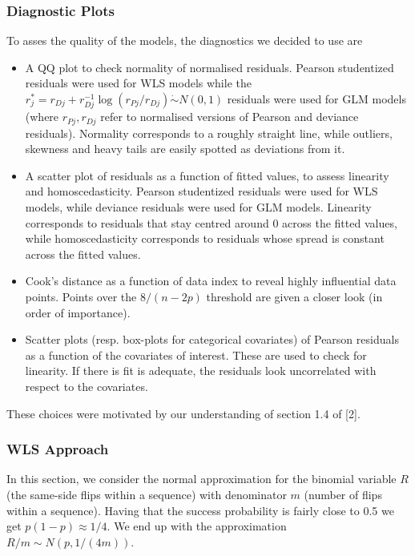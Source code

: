 \documentclass[a4paper, 12pt,oneside]{article}
\begin{document}
			\subsubsection{Diagnostic Plots}
				To asses the quality of the models, the diagnostics we decided to use are 
				\begin{itemize}
					\item A QQ plot to check normality of normalised residuals. Pearson studentized residuals were used for WLS models while the $r_j^*=r_{D j}+r_{D j}^{-1} \log \left(r_{P j} / r_{D j}\right) \dot{\sim} N(0,1)$ residuals were used for GLM models (where $r_{P j},r_{D j}$ refer to normalised versions of Pearson and deviance residuals). Normality corresponds to a roughly straight line, while outliers, skewness and heavy tails are easily spotted as deviations from it.
					\item A scatter plot of residuals as a function of fitted values, to assess linearity and homoscedasticity. Pearson studentized residuals were used for WLS models, while deviance residuals were used for GLM models. Linearity corresponds to residuals that stay centred around 0 across the fitted values, while homoscedasticity corresponds to residuals whose spread is constant across the fitted values.
					\item Cook's distance as a function of data index to reveal highly influential data points. Points over the $8/(n-2p)$ threshold are given a closer look (in order of importance). 
					\item Scatter plots (resp. box-plots for categorical covariates) of Pearson residuals as a function of the covariates of interest. These are used to check for linearity. If there is fit is adequate, the residuals look uncorrelated with respect to the covariates. 
				\end{itemize}
				These choices were motivated by our understanding of section 1.4 of [2]. 
			\subsubsection{WLS Approach}
			In this section, we consider the normal approximation for the binomial variable $R$ (the same-side flips within a sequence) with denominator $m$ (number of flips within a sequence). 
			Having that the success probability is fairly close to 0.5 we get $p(1-p)\approx1/4$. We end up with the approximation $R/m \sim N(p,1/(4m))$. 
\end{document}
